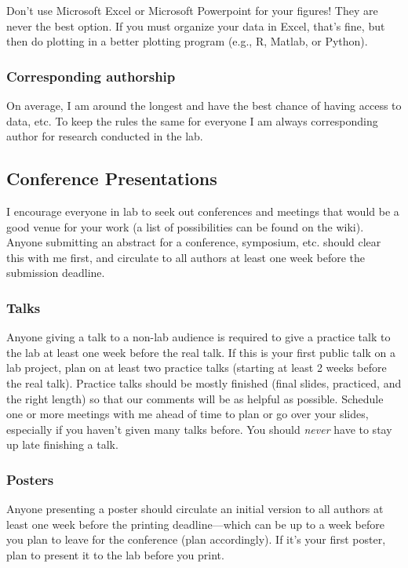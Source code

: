 \documentclass[letterpaper,12pt,oneside]{memoir}
\begin{document}
\begin{shaded}
\noindent Don't use Microsoft Excel or Microsoft Powerpoint for your figures! They are never the best option. If you must organize your data in Excel, that's fine, but then do plotting in a better plotting program (e.g., R, Matlab, or Python).
\end{shaded}


\subsubsection{Corresponding authorship}
On average, I am around the longest and have the best chance of having access to data, etc. To keep the rules the same for everyone I am always corresponding author for research conducted in the lab.



\subsection{Conference Presentations}
I encourage everyone in lab to seek out conferences and meetings that would be a good venue for your work (a list of possibilities can be found on the wiki). Anyone submitting an abstract for a conference, symposium, etc. should clear this with me first, and circulate to all authors at least one week before the submission deadline.

\subsubsection{Talks}
Anyone giving a talk to a non-lab audience is required to give a practice talk to the lab at least one week before the real talk. If this is your first public talk on a lab project, plan on at least two practice talks (starting at least 2 weeks before the real talk). Practice talks should be mostly finished (final slides, practiced, and the right length) so that our comments will be as helpful as possible. Schedule one or more meetings with me ahead of time to plan or go over your slides, especially if you haven't given many talks before. You should \textit{never} have to stay up late finishing a talk.

\subsubsection{Posters}
Anyone presenting a poster should circulate an initial version to all authors at least one week before the printing deadline---which can be up to a week before you plan to leave for the conference (plan accordingly). If it's your first poster, plan to present it to the lab before you print. 
\end{document}

